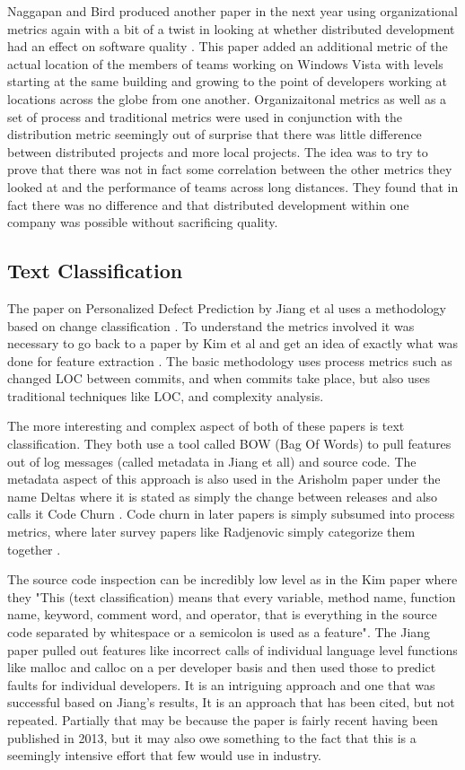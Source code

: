 \documentclass{sig-alternate-05-2015}
\begin{document}
Naggapan and Bird produced another paper in the next year using organizational metrics again with a bit of a twist in looking at whether distributed development had an effect on software quality \cite{Bird}.  This paper added an additional metric of the actual location of the members of teams working on Windows Vista with levels starting at the same building and growing to the point of developers working at locations across the globe from one another.  Organizaitonal metrics as well as a set of process and traditional metrics were used in conjunction with the distribution metric seemingly out of surprise that there was little difference between distributed projects and more local projects.  The idea was to try to prove that there was not in fact some correlation between the other metrics they looked at and the performance of teams across long distances.  They found that in fact there was no difference and that distributed development within one company was possible without sacrificing quality.

\subsection{Text Classification}
The paper on Personalized Defect Prediction by Jiang et al uses a methodology based on change classification \cite{Jiang}.  To understand the metrics involved it was necessary to go back to a paper by Kim et al and get an idea of exactly what was done for feature extraction \cite{Kim}.  The basic methodology uses process metrics such as changed LOC between commits, and when commits take place, but also uses traditional techniques like LOC, and complexity analysis.  

The more interesting and complex aspect of both of these papers is text classification.  They both use a tool called BOW (Bag Of Words) to pull features out of log messages (called metadata in Jiang et all) and source code.  The metadata aspect of this approach is also used in the Arisholm paper under the name Deltas where it is stated as simply the change between releases and also calls it Code Churn \cite{Arisholm}.  Code churn in later papers is simply subsumed into process metrics, where later survey papers like Radjenovic simply categorize them together \cite{Radjenovic}.  

The source code inspection can be incredibly low level as in the Kim paper where they "This (text classification) means that every variable, method name, function name, keyword, comment word, and operator, that is everything  in the source code separated by whitespace or a semicolon is used as a feature"\cite{Kim}.  The Jiang paper pulled out features like incorrect calls of individual language level functions like malloc and calloc on a per developer basis and then used those to predict faults for individual developers.  It is an intriguing approach and one that was successful based on Jiang's results, It is an approach that has been cited, but not repeated.  Partially that may be because the paper is fairly recent having been published in 2013, but it may also owe something to the fact that this is a seemingly intensive effort that few would use in industry.
\end{document}
